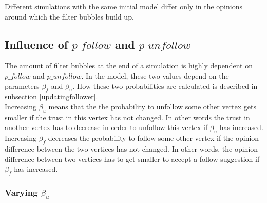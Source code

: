 \documentclass[11pt]{article}
\begin{document}
Different simulations with the same initial model differ only in the opinions around which the filter bubbles build up.

\subsection{Influence of $p\_follow$ and $p\_unfollow$}

The amount of filter bubbles at the end of a simulation is highly dependent on $p\_follow$ and $p\_unfollow$. In the model, these two values depend on the parameters $\beta_f$ and $\beta_u$. How these two probabilities are calculated is described in subsection \ref{updatingfollower}.\\
Increasing $\beta_u$ means that the the probability to unfollow some other vertex gets smaller if the trust in this vertex has not changed. In other words the trust in another vertex has to decrease in order to unfollow this vertex if $\beta_u$ has increased.\\
Increasing $\beta_f$ decreases the probability to follow some other vertex if the opinion difference between the two vertices has not changed. In other words, the opinion difference between two vertices has to get smaller to accept a follow suggestion if $\beta_f$ has increased.

\subsubsection{Varying $\beta_u$}
\end{document}
